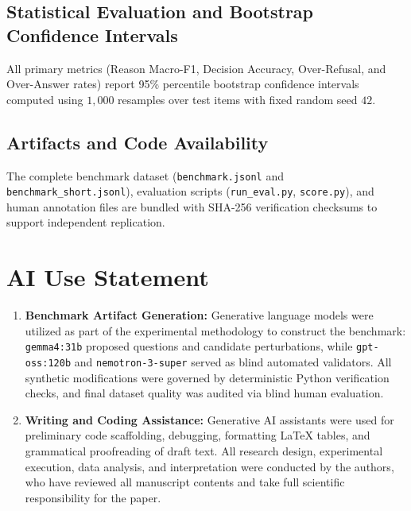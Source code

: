 \documentclass[11pt,letterpaper]{article}
\begin{document}
\subsection{Statistical Evaluation and Bootstrap Confidence Intervals}
All primary metrics (Reason Macro-F1, Decision Accuracy, Over-Refusal, and Over-Answer rates) report 95\% percentile bootstrap confidence intervals computed using $1{,}000$ resamples over test items with fixed random seed $42$.

\subsection{Artifacts and Code Availability}
The complete benchmark dataset (\texttt{benchmark.jsonl} and \texttt{benchmark\_short.jsonl}), evaluation scripts (\texttt{run\_eval.py}, \texttt{score.py}), and human annotation files are bundled with SHA-256 verification checksums to support independent replication.

\section{AI Use Statement}
\label{app:ai_use}

\begin{enumerate}
    \item \textbf{Benchmark Artifact Generation:} Generative language models were utilized as part of the experimental methodology to construct the benchmark: \texttt{gemma4:31b} proposed questions and candidate perturbations, while \texttt{gpt-oss:120b} and \texttt{nemotron-3-super} served as blind automated validators. All synthetic modifications were governed by deterministic Python verification checks, and final dataset quality was audited via blind human evaluation.
    \item \textbf{Writing and Coding Assistance:} Generative AI assistants were used for preliminary code scaffolding, debugging, formatting LaTeX tables, and grammatical proofreading of draft text. All research design, experimental execution, data analysis, and interpretation were conducted by the authors, who have reviewed all manuscript contents and take full scientific responsibility for the paper.
\end{enumerate}



\end{document}
